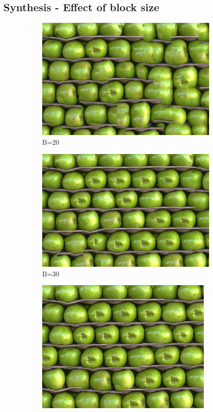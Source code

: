 \documentclass[10pt,twocolumn,letterpaper]{article}
\begin{document}
\subsection{Synthesis - Effect of block size}

\begin{figure}[h]
    \centering
    \begin{subfigure}[h]{0.2\textwidth}
        \centering
        \includegraphics[scale=0.25]{../results/syn/out_apples_B_20.png}
        \caption{B=20}
    \end{subfigure}
    \hfill
    \begin{subfigure}[h]{0.2\textwidth}
       \centering
       \includegraphics[scale=0.25]{../results/syn/out_apples_B_30.png}
       \caption{B=30}
   \end{subfigure}
   \hfill
   \begin{subfigure}[h]{0.2\textwidth}
       \centering
       \includegraphics[scale=0.25]{../results/syn/out_apples_B_40.png}

\end{subfigure}
\end{figure}
\end{document}
